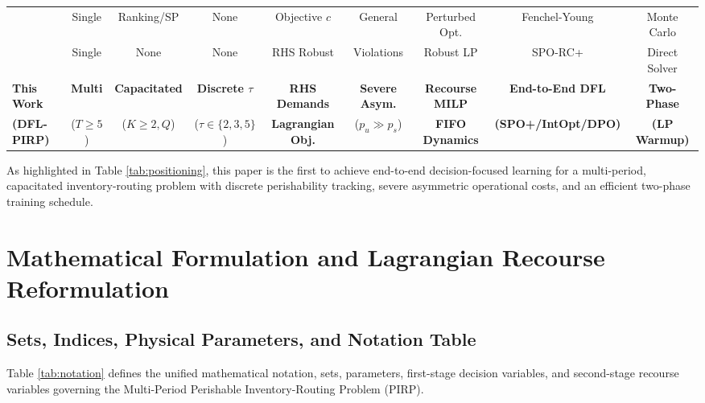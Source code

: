 \documentclass[11pt,a4paper]{article}
\theoremstyle{definition}
\theoremstyle{remark}
\begin{document}
\begin{table}[H]
{\begin{tabular}{@{}lcccccccc@{}}
\citet{berthet2020learning} & Single & Ranking/SP & None & Objective $c$ & General & Perturbed Opt. & Fenchel-Young & Monte Carlo \\
\citet{im2025smart} & Single & None & None & RHS Robust & Violations & Robust LP & SPO-RC+ & Direct Solver \\
\midrule
\textbf{This Work} & \textbf{Multi} & \textbf{Capacitated} & \textbf{Discrete $\tau$} & \textbf{RHS Demands} & \textbf{Severe Asym.} & \textbf{Recourse MILP} & \textbf{End-to-End DFL} & \textbf{Two-Phase} \\
\textbf{(DFL-PIRP)} & ($T \ge 5$) & ($K \ge 2, Q$) & ($\tau \in \{2, 3, 5\}$) & \textbf{Lagrangian Obj.} & ($p_u \gg p_s$) & \textbf{FIFO Dynamics} & \textbf{(SPO+/IntOpt/DPO)} & \textbf{(LP Warmup)} \\
\bottomrule
\end{tabular}%
}
\end{table}

As highlighted in Table \ref{tab:positioning}, this paper is the first to achieve end-to-end decision-focused learning for a multi-period, capacitated inventory-routing problem with discrete perishability tracking, severe asymmetric operational costs, and an efficient two-phase training schedule.

\section{Mathematical Formulation and Lagrangian Recourse Reformulation}
\label{sec:formulation}

\subsection{Sets, Indices, Physical Parameters, and Notation Table}
\label{subsec:notation}
Table \ref{tab:notation} defines the unified mathematical notation, sets, parameters, first-stage decision variables, and second-stage recourse variables governing the Multi-Period Perishable Inventory-Routing Problem (PIRP).
\end{document}

